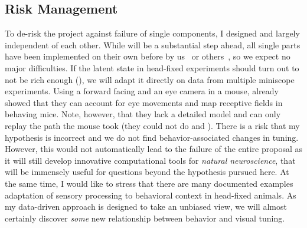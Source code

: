 \documentclass[COG,11pt]{ercgrant}
\begin{document}
\subsection{Risk Management}
To de-risk the project against failure of single components, I designed  and  largely independent of each other. While  will be a substantial step ahead, all single parts have been implemented on their own before by us~\parencite{Sinz2018-sk, Bashiri2021-or} or others~\parencite{Parker2022-ac,Holmgren2021-jv}, so we expect no major difficulties. If the latent state in head-fixed experiments should turn out to not be rich enough (), we will adapt it directly on data from multiple miniscope experiments. 
Using a forward facing and an eye camera in a mouse, \textcite{Parker2022-ac} already showed that they can account for eye movements and map receptive fields in behaving mice. Note, however, that they lack a detailed model and can only replay the path the mouse took (they could not do  and ). There is a risk that my hypothesis is incorrect and we do not find behavior-associated changes in tuning. However, this would not automatically lead to the failure of the entire proposal as it will still develop innovative computational tools for \textit{natural neuroscience}, that will be immensely useful for questions beyond the hypothesis pursued here. At the same time, I would like to stress that there are many documented examples adaptation of sensory processing to behavioral context in head-fixed animals. As my data-driven approach is designed to take an unbiased view, we will almost certainly discover \textit{some} new relationship between behavior and visual tuning. 

\begin{small}
\printbibliography
\end{small}
\end{document}
